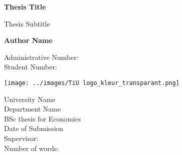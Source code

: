 \begin{titlepage}
    \begin{center}
        \vspace*{1cm}
 
        \Huge
        \textbf{Thesis Title}
 
        \vspace{0.5cm}
        Thesis Subtitle
        
        \vspace{1.5cm}
        
        \textbf{Author Name}
        
        \vspace{0.5cm}
        \Large
        Administrative Number:\@ \\ 
        Student Number:\@
 
        \vfill
                          
        \texttt{[image: ../images/TiU logo\_kleur\_transparant.png]}
        
        \vspace{0.8cm}
        
        University Name\\
        Department Name\\
        BSc thesis for Economics \\
        Date of Submission \\
        Supervisor: \\
        Number of words:

             
    \end{center}
\end{titlepage}
